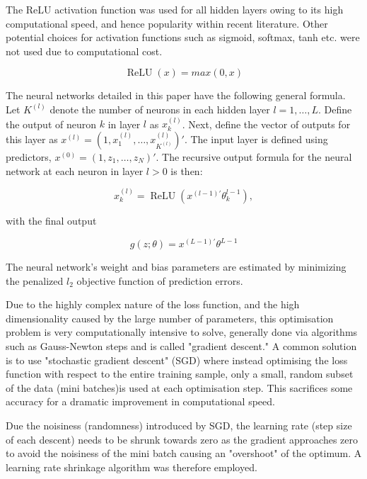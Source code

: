 \documentclass[man, a4paper, biblatex]{article}
\begin{document}
The ReLU activation function was used for all hidden layers owing to its high computational speed, and hence popularity within recent literature. Other potential choices for activation functions such as sigmoid, softmax, tanh etc. were not used due to computational cost.

\begin{equation}
	\operatorname{ReLU}(x) = max(0, x)
\end{equation}

The neural networks detailed in this paper have the following general formula. Let $K^{(l)}$ denote the number of neurons in each hidden layer $l = 1, \dots, L$. Define the output of neuron $k$ in layer $l$ as $x_k^{(l)}$. Next, define the vector of outputs for this layer as $x^{(l)} = (1, x_1^{(l)}, \dots, x_{K^(l)}^{(l)})'$. The input layer is defined using predictors, $x^{(0)} = (1, z_1, \dots, z_N)'$. The recursive output formula for the neural network at each neuron in layer $l > 0$ is then:

\begin{equation}
	x_k^{(l)} = \operatorname{ReLU}(x^{(l-1)'}\theta_k^{l-1}),
\end{equation}

with the final output

\begin{equation}
	g(z;\theta) = x^{(L-1)'}\theta^{L-1}
\end{equation}

The neural network's weight and bias parameters are estimated by minimizing the penalized $l_2$ objective function of prediction errors.

Due to the highly complex nature of the loss function, and the high dimensionality caused by the large number of parameters, this optimisation problem is very computationally intensive to solve, generally done via algorithms such as Gauss-Newton steps and is called "gradient descent." A common solution is to use "stochastic gradient descent" (SGD) where instead optimising the loss function with respect to the entire training sample, only a small, random subset of the data (mini batches)is used at each optimisation step. This sacrifices some accuracy for a dramatic improvement in computational speed.

Due the noisiness (randomness) introduced by SGD, the learning rate (step size of each descent) needs to be shrunk towards zero as the gradient approaches zero to avoid the noisiness of the mini batch causing an "overshoot" of the optimum. A learning rate shrinkage algorithm was therefore employed.
\end{document}
